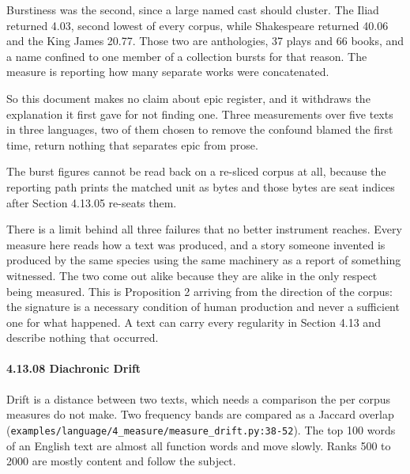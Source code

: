 Burstiness was the second, since a large named cast should cluster. The Iliad returned 4.03, second lowest of every corpus, while Shakespeare returned 40.06 and the King James 20.77. Those two are anthologies, 37 plays and 66 books, and a name confined to one member of a collection bursts for that reason. The measure is reporting how many separate works were concatenated.

So this document makes no claim about epic register, and it withdraws the explanation it first gave for not finding one. Three measurements over five texts in three languages, two of them chosen to remove the confound blamed the first time, return nothing that separates epic from prose.

The burst figures cannot be read back on a re-sliced corpus at all, because the reporting path prints the matched unit as bytes and those bytes are seat indices after Section 4.13.05 re-seats them.

There is a limit behind all three failures that no better instrument reaches. Every measure here reads how a text was produced, and a story someone invented is produced by the same species using the same machinery as a report of something witnessed. The two come out alike because they are alike in the only respect being measured. This is Proposition 2 arriving from the direction of the corpus: the signature is a necessary condition of human production and never a sufficient one for what happened. A text can carry every regularity in Section 4.13 and describe nothing that occurred.

\paragraph{4.13.08 Diachronic Drift}

Drift is a distance between two texts, which needs a comparison the per corpus measures do not make. Two frequency bands are compared as a Jaccard overlap (\texttt{examples/\allowbreak{}language/\allowbreak{}4\_\allowbreak{}measure/\allowbreak{}measure\_\allowbreak{}drift.\allowbreak{}py:38-\allowbreak{}52}). The top 100 words of an English text are almost all function words and move slowly. Ranks 500 to 2000 are mostly content and follow the subject.

